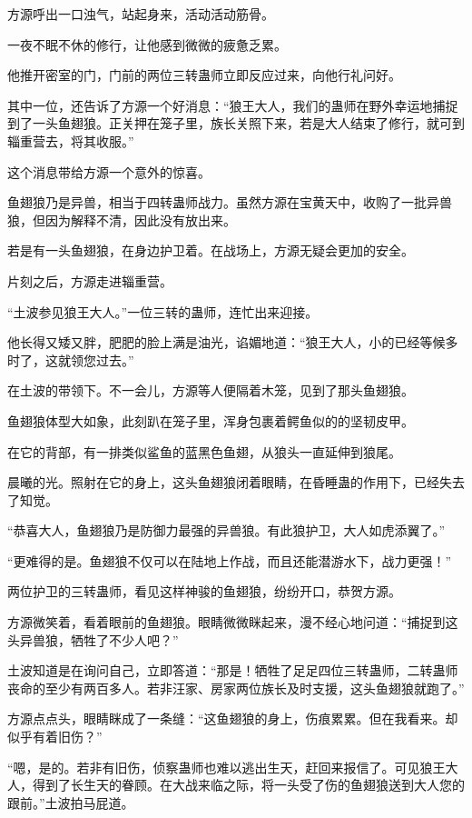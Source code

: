 \begin{this_body}
方源呼出一口浊气，站起身来，活动活动筋骨。

一夜不眠不休的修行，让他感到微微的疲惫乏累。

他推开密室的门，门前的两位三转蛊师立即反应过来，向他行礼问好。

其中一位，还告诉了方源一个好消息：“狼王大人，我们的蛊师在野外幸运地捕捉到了一头鱼翅狼。正关押在笼子里，族长关照下来，若是大人结束了修行，就可到辎重营去，将其收服。”

这个消息带给方源一个意外的惊喜。

鱼翅狼乃是异兽，相当于四转蛊师战力。虽然方源在宝黄天中，收购了一批异兽狼，但因为解释不清，因此没有放出来。

若是有一头鱼翅狼，在身边护卫着。在战场上，方源无疑会更加的安全。

片刻之后，方源走进辎重营。

“土波参见狼王大人。”一位三转的蛊师，连忙出来迎接。

他长得又矮又胖，肥肥的脸上满是油光，谄媚地道：“狼王大人，小的已经等候多时了，这就领您过去。”

在土波的带领下。不一会儿，方源等人便隔着木笼，见到了那头鱼翅狼。

鱼翅狼体型大如象，此刻趴在笼子里，浑身包裹着鳄鱼似的的坚韧皮甲。

在它的背部，有一排类似鲨鱼的蓝黑色鱼翅，从狼头一直延伸到狼尾。

晨曦的光。照射在它的身上，这头鱼翅狼闭着眼睛，在昏睡蛊的作用下，已经失去了知觉。

“恭喜大人，鱼翅狼乃是防御力最强的异兽狼。有此狼护卫，大人如虎添翼了。”

“更难得的是。鱼翅狼不仅可以在陆地上作战，而且还能潜游水下，战力更强！”

两位护卫的三转蛊师，看见这样神骏的鱼翅狼，纷纷开口，恭贺方源。

方源微笑着，看着眼前的鱼翅狼。眼睛微微眯起来，漫不经心地问道：“捕捉到这头异兽狼，牺牲了不少人吧？”

土波知道是在询问自己，立即答道：“那是！牺牲了足足四位三转蛊师，二转蛊师丧命的至少有两百多人。若非汪家、房家两位族长及时支援，这头鱼翅狼就跑了。”

方源点点头，眼睛眯成了一条缝：“这鱼翅狼的身上，伤痕累累。但在我看来。却似乎有着旧伤？”

“嗯，是的。若非有旧伤，侦察蛊师也难以逃出生天，赶回来报信了。可见狼王大人，得到了长生天的眷顾。在大战来临之际，将一头受了伤的鱼翅狼送到大人您的跟前。”土波拍马屁道。


\end{this_body}
